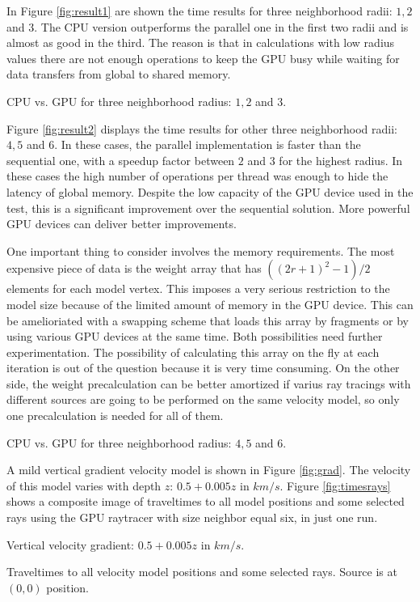 In Figure \ref{fig:result1} are shown the time results
for three neighborhood radii: $1,2$ and $3$. The CPU 
version outperforms the parallel one in the first two
radii and is almost as good in the third. The reason is
that in calculations with low radius values there 
are not enough operations to keep the GPU busy while waiting
for data transfers from global to shared memory.

{CPU vs. GPU for three neighborhood radius: $1,2$ and $3$.}

Figure \ref{fig:result2} displays the time results
for other three neighborhood radii: $4,5$ and $6$.
In these cases, the parallel implementation is faster
than the sequential one, with a speedup factor between
$2$ and $3$ for the highest radius. In these cases the 
high number of operations per thread was enough to
hide the latency of global memory. Despite the low capacity
of the GPU device used in the test, this is a significant 
improvement over the sequential solution. More powerful
GPU devices can deliver better improvements.

One important thing to consider involves the memory requirements.
The most expensive piece of data is the weight array that
has $((2r+1)^2-1)/2$ elements for each model vertex. This imposes
a very serious restriction to the model size because of the limited
amount of memory in the GPU device. This can be amelioriated 
with a swapping scheme that loads this array by fragments or
by using various GPU devices at the same time. Both possibilities
need further experimentation. The possibility of calculating
this array on the fly at each iteration is out of the question
because it is very time consuming. On the other side,
the weight precalculation can be better amortized if varius ray 
tracings with different sources are going to be performed on 
the same velocity model, so only one precalculation is needed 
for all of them.

{CPU vs. GPU for three neighborhood radius: $4,5$ and $6$.}

A mild vertical gradient velocity model is shown in Figure \ref{fig:grad}.
The velocity of this model varies with depth $z$: $0.5+0.005z$ in $km/s$.
Figure \ref{fig:timesrays} shows a composite image of traveltimes to all
model positions and some selected rays using the GPU raytracer
with size neighbor equal six, in just one run. 
\onecolumn

{Vertical velocity gradient: $0.5+0.005z$ in $km/s$.}


{Traveltimes to all velocity model positions and some selected rays. Source is
at $(0,0)$ position.}

\twocolumn


